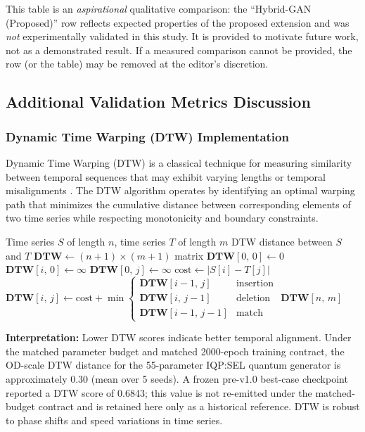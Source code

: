 This table is an \emph{aspirational} qualitative comparison: the ``Hybrid-GAN (Proposed)'' row reflects expected properties of the proposed extension and was \emph{not} experimentally validated in this study. It is provided to motivate future work, not as a demonstrated result. If a measured comparison cannot be provided, the row (or the table) may be removed at the editor's discretion.


\subsection{Additional Validation Metrics Discussion}

\subsubsection{Dynamic Time Warping (DTW) Implementation}

Dynamic Time Warping (DTW) is a classical technique for measuring similarity between temporal sequences that may exhibit varying lengths or temporal misalignments \cite{sakoeChiba1978}. The DTW algorithm operates by identifying an optimal warping path that minimizes the cumulative distance between corresponding elements of two time series while respecting monotonicity and boundary constraints.

\begin{algorithm}[ht]
 \caption{Dynamic Time Warping}
 \label{alg:dtw}
 \begin{algorithmic}[1]
 \Require Time series $S$ of length $n$, time series $T$ of length $m$
 \Ensure DTW distance between $S$ and $T$
 \State $\mathbf{DTW} \gets (n+1) \times (m+1)$ matrix
 \State $\mathbf{DTW}[0,\,0] \gets 0$
 \State $\mathbf{DTW}[i,\,0] \gets \infty$
 \EndFor
 \State $\mathbf{DTW}[0,\,j] \gets \infty$
 \EndFor
 \State $\text{cost} \gets |S[i] - T[j]|$
 \State $\mathbf{DTW}[i,\,j] \gets \text{cost} + \min\begin{cases}
 \mathbf{DTW}[i-1,\,j] & \text{insertion} \\
 \mathbf{DTW}[i,\,j-1] & \text{deletion} \\
 \mathbf{DTW}[i-1,\,j-1] & \text{match}
 \end{cases}$
 \EndFor
 \EndFor
 \State \Return $\mathbf{DTW}[n,\,m]$
 \end{algorithmic}
\end{algorithm}

\textbf{Interpretation:}
Lower DTW scores indicate better temporal alignment. Under the matched parameter budget and matched 2000-epoch training contract, the OD-scale DTW distance for the 55-parameter IQP:SEL quantum generator is approximately 0.30 (mean over 5 seeds). A frozen pre-v1.0 best-case checkpoint reported a DTW score of 0.6843; this value is not re-emitted under the matched-budget contract and is retained here only as a historical reference. DTW is robust to phase shifts and speed variations in time series.

